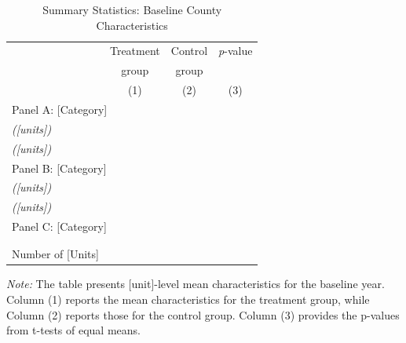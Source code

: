 \begin{table}[H]
\normalsize
\centering
\caption{Summary Statistics: Baseline County Characteristics}\label{Table-Sum1}
\setlength{\tabcolsep}{2pt}
\begin{threeparttable}
\begin{tabular}{@{}lccc@{}}
\toprule
\midrule
         & Treatment   & Control    & \textit{p}-value    \\
        &   group  &  group  &             \\
         & (1)  &  (2) &  (3) \\
\midrule
\multicolumn{4}{l}{Panel A: [Category]} \\
\midrule
[Variable 1] \textit{([units])}        & & & \\
[Variable 2] \textit{([units])}        & & & \\
\midrule
\multicolumn{4}{l}{Panel B: [Category]} \\
\midrule
[Variable 3] \textit{([units])}        & & & \\
[Variable 4] \textit{([units])}        & & & \\
\midrule
\multicolumn{4}{l}{Panel C: [Category]} \\
\midrule
[Variable 5]                           & & & \\
[Variable 6]                           & & & \\
\midrule
Number of [Units] & & & \\
\midrule
\bottomrule
\end{tabular}
\begin{tablenotes}[flushleft]
\item \footnotesize \textit{Note:} The table presents [unit]-level mean characteristics for the baseline year. Column (1) reports the mean characteristics for the treatment group, while Column (2) reports those for the control group. Column (3) provides the p-values from t-tests of equal means.
\end{tablenotes}
\end{threeparttable}
\end{table}

